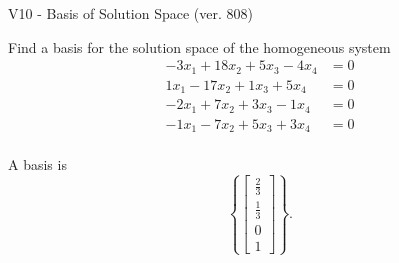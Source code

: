 \begin{exercise}
  \begin{exerciseTitle}V10 - Basis of Solution Space (ver. 808)\end{exerciseTitle}
  \begin{exerciseStatement}
    Find a basis for the solution space of the homogeneous system 
\begin{align*}
 -3 x_ 1 + 18 x_ 2 + 5 x_ 3 -4 x_ 4 &= 0  \\ 
  1 x_ 1 -17 x_ 2 + 1 x_ 3 + 5 x_ 4 &= 0  \\ 
  -2 x_ 1 + 7 x_ 2 + 3 x_ 3 -1 x_ 4 &= 0  \\ 
  -1 x_ 1 -7 x_ 2 + 5 x_ 3 + 3 x_ 4 &= 0  \\ 
 \end{align*}


 
  \end{exerciseStatement}

  \begin{exerciseAnswer}
   A basis is   
\[\left\{\left[\begin{array}{c}
\frac{2}{3} \\
\frac{1}{3} \\
0 \\
1
\end{array}\right]\right\}.\]

  


  \end{exerciseAnswer}
\end{exercise}